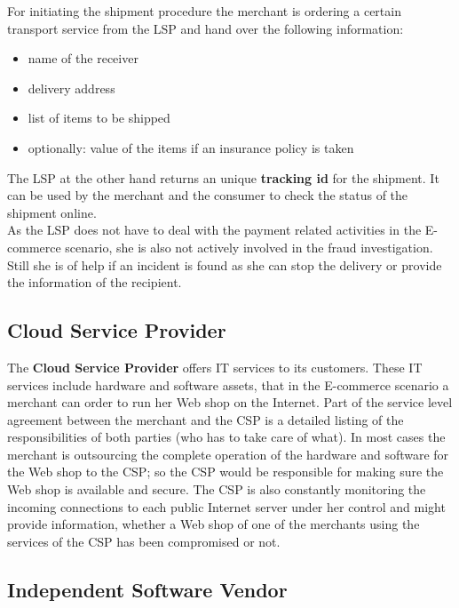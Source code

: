 For initiating the shipment procedure the merchant is ordering a certain transport service from the \gls{LSP} and hand over the following information:\@

\begin{itemize}
	\item name of the receiver
	\item delivery address
	\item list of items to be shipped
	\item optionally: value of the items if an insurance policy is taken
\end{itemize}

The \gls{LSP} at the other hand returns an unique \textbf{tracking id} for the shipment. It can be used by the merchant and the consumer to check the status of the shipment online. \\

As the \gls{LSP} does not have to deal with the payment related activities in the E-commerce scenario, she is also not actively involved in the fraud investigation. Still she is of help if an incident is found as she can stop the delivery or provide the information of the recipient.


\subsection{Cloud Service Provider}
\label{subsec:stakeholder_csp}

The \textbf{Cloud Service Provider} offers IT services to its customers. These IT services include hardware and software assets, that in the E-commerce scenario a merchant can order to run her Web shop on the Internet. Part of the service level agreement between the merchant and the \gls{CSP} is a detailed listing of the responsibilities of both parties (who has to take care of what). In most cases the merchant is outsourcing the complete operation of the hardware and software for the Web shop to the \gls{CSP}; so the \gls{CSP} would be responsible for making sure the Web shop is available and secure. The \gls{CSP} is also constantly monitoring the incoming connections to each public Internet server under her control and might provide information, whether a Web shop of one of the merchants using the services of the \gls{CSP} has been compromised or not.


\subsection{Independent Software Vendor}
\label{subsec:stakeholder_isv}

